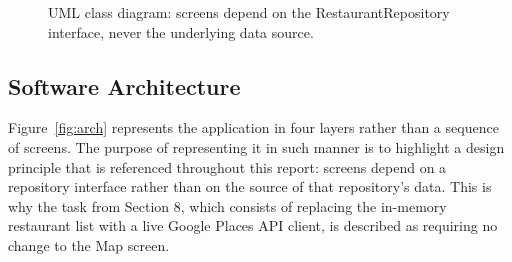 \documentclass[12pt, a4paper]{article}
\begin{document}
\begin{figure}[H]
\centering
{}
\caption[UML class diagram for Spot To Go.]{UML class diagram: screens depend on the RestaurantRepository interface, never the underlying data source.}
\label{fig:classdiagram}
\end{figure}

\subsection{Software Architecture}

Figure~\ref{fig:arch} represents the application in four layers rather than a sequence of screens. The purpose of representing it in such manner is to highlight a design principle that is referenced throughout this report: screens depend on a repository interface rather than on the source of that repository's data. This is why the task from Section 8, which consists of replacing the in-memory restaurant list with a live Google Places API client, is described as requiring no change to the Map screen.
\end{document}
